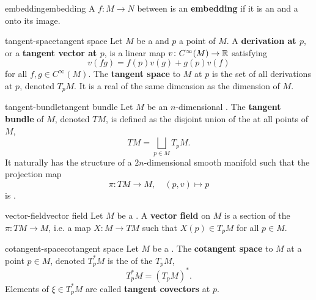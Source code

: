 \begin{topic}{embedding}{embedding}
    A  $f \colon M \to N$ between  is an \textbf{embedding} if it is an  and a  onto its image.
\end{topic}

\begin{topic}{tangent-space}{tangent space}
    Let $M$ be a  and $p$ a point of $M$. A \textbf{derivation at $p$}, or a \textbf{tangent vector at $p$}, is a linear map $v \colon C^\infty(M) \to \mathbb{R}$ satisfying
    \[ v(fg) = f(p) v(g) + g(p) v(f) \]
    for all $f, g \in C^\infty(M)$. The \textbf{tangent space} to $M$ at $p$ is the set of all derivations at $p$, denoted $T_p M$. It is a real  of the same dimension as the dimension of $M$.
\end{topic}

\begin{topic}{tangent-bundle}{tangent bundle}
    Let $M$ be an $n$-dimensional . The \textbf{tangent bundle} of $M$, denoted $TM$, is defined as the disjoint union of the  at all points of $M$,
    \[ TM = \bigsqcup_{p \in M} T_p M . \]
    It naturally has the structure of a $2n$-dimensional smooth manifold such that the projection map
    \[ \pi \colon TM \to M, \quad (p, v) \mapsto p \]
    is .
\end{topic}

\begin{topic}{vector-field}{vector field}
    Let $M$ be a . A \textbf{vector field} on $M$ is a section of the  $\pi \colon TM \to M$, i.e. a map $X \colon M \to TM$ such that $X(p) \in T_p M$ for all $p \in M$.
\end{topic}

\begin{topic}{cotangent-space}{cotangent space}
    Let $M$ be a . The \textbf{cotangent space} to $M$ at a point $p \in M$, denoted $T^*_p M$ is the  of the  $T_p M$,
    \[ T^*_p M = (T_p M)^* . \]
    Elements of $\xi \in T^*_p M$ are called \textbf{tangent covectors} at $p$.
\end{topic}

